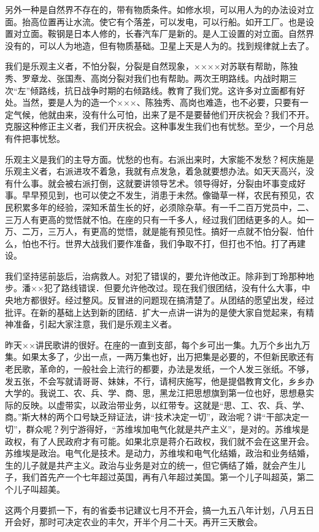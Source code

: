 另外一种是自然界不存在的，带有物质条件。如修水坝，可以用人为的办法设对立面。抬高位置再让水流。使它有个落差，可以发电，可以行船。如开工厂。也是设置对立面。鞍钢是日本人修的，长春汽车厂是新的。是人工设置的对立面。自然界没有的，可以人为地造，但有物质基础。卫星上天是人为的。找到规律就上去了。

我们是乐观主义者，不怕分裂，分裂是自然现象，××××对苏联有帮助，陈独秀、罗章龙、张国焘、高岗分裂对我们也有帮助。两次王明路线。内战时期三次“左”倾路线，抗日战争时期的右倾路线。教育了我们党。这许多对立面都有好处。当然，要是人为的造一个×××、陈独秀、高岗也难造，也不必要，只要有一定气候，他就由来，没有什么可怕，出来了是不是要替他们开庆祝会？我们不开。克服这种修正主义者，我们开庆祝会。这种事发生我们也有忧愁。至少，一个月总有件把事忧愁。

乐观主义是我们的主导方面。忧愁的也有。右派出来时，大家能不发愁？柯庆施是乐观主义者，右派进攻不着急，我就有点发急，着急就要想办法。如天天高兴，没有什么事。就会被右派打倒，这就要讲领导艺术。领导得好，分裂由坏事变成好事。早早预见到，也可以使之不发生，消患于未然。像锄草一样，农民有预见，农民积累多年的经验，深知禾苗生长的好，必须除杂草。有一千二百万党员中，二、三万人有更高的觉悟就不怕。在座的只有一千多人，经过我们团结更多的人。如一万、二万，三万人，有更高的觉悟，就是能有预见性。搞好一点就不怕分裂．怕什么，怕也不行。世界大战我们要作准备，我们争取不打，但打也不怕。打了再建设。

我们坚持惩前毖后，治病救人。对犯了错误的，要允许他改正。除非到丁玲那种地步。潘××犯了路线错误．但要允许他改过。现在我们很团结，没有什么大事，中央地方都很好。经过整风。反冒进的问题现在搞清楚了。从团结的愿望出发，经过批评。在新的基础上达到新的团结．扩大一点讲一讲为的是使大家自觉起来，有精神准备，引起大家注意，我们是乐观主义者。

昨天××讲民歌讲的很好。在座的一直到支部，每个乡可出一集。九万个乡出九万集。如果太多了，少出一点，一两万集也好，出万把集是必要的，不但新民歌还有老民歌，革命的，一般社会上流行的都要，办法是发纸，一个人发三张纸。不够，发五张，不会写就请哥哥、妹妹，不行，请柯庆施写，他是提倡教育文化，乡乡办大学的。我说工、农、兵、学、商、思，黑龙江把思想旗到第一位也好，思想悬实际的反映。以虚带实，以政治带业务，以红带专。这就是“思、工、农、兵、学、商。”斯大林的两个口号缺乏辩证法，讲“技术决定一切”，政治呢？讲“干部决定一切”，群众呢？列宁游得好，“苏维埃加电气化就是共产主义”，是对的。苏维埃是政权，有了人民政府才有可能。如果北京是蒋介石政权，我们就不会在这里开会。苏维埃是政治。电气化是技术。是动力，苏维埃和电气化结婚，政治和业务结婚，生的儿子就是共产主义。政治与业务是对立的统一，但它俩结了婚，就会产生儿子，我们首先产一个七年超过英国，再有八年超过美国。第一个儿子叫超英，第二个儿子叫超美。

这两个月要抓一下，有的省委书记建议七月不开会，搞一九五八年计划，八月五日开会好，那时可决定农业的丰欠，开半个月二十天。再开三天散会。


